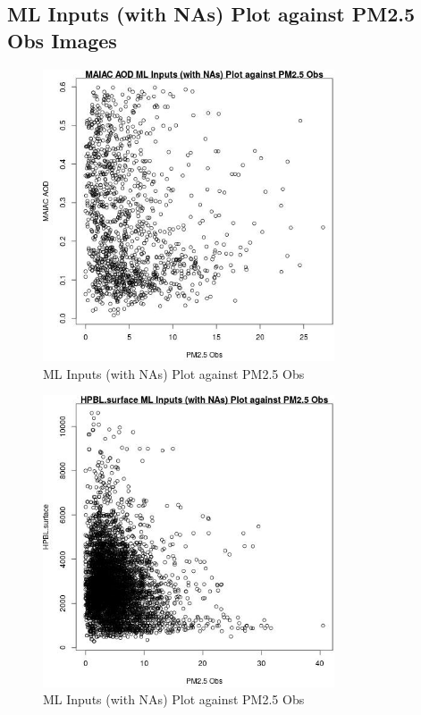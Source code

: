 
\subsection{ML Inputs (with NAs) Plot against PM2.5 Obs Images} 
 

\begin{figure} 
\centering  
\includegraphics[width=0.77\textwidth]{Code_Outputs/Report_ML_input_PM25_Step4_part_e_de_duplicated_aveswNAs_MAIAC_AODvPM25_Obs.jpg} 
\caption{\label{fig:Report_ML_input_PM25_Step4_part_e_de_duplicated_aveswNAsMAIAC_AODvPM25_Obs}ML Inputs (with NAs) Plot against PM2.5 Obs} 
\end{figure} 
 

\begin{figure} 
\centering  
\includegraphics[width=0.77\textwidth]{Code_Outputs/Report_ML_input_PM25_Step4_part_e_de_duplicated_aveswNAs_HPBLsurfacevPM25_Obs.jpg} 
\caption{\label{fig:Report_ML_input_PM25_Step4_part_e_de_duplicated_aveswNAsHPBLsurfacevPM25_Obs}ML Inputs (with NAs) Plot against PM2.5 Obs} 
\end{figure} 
 

